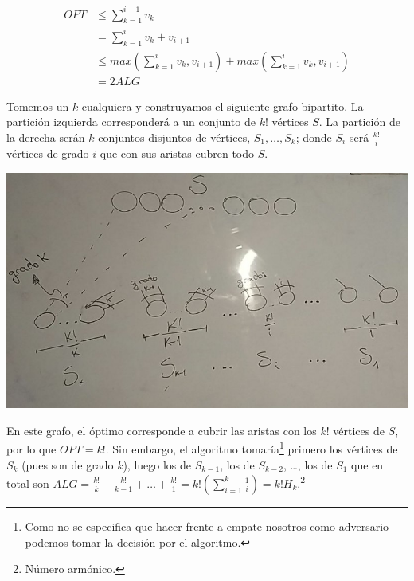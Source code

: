 \documentclass[dcc,uchile]{fcfmcourse}
\begin{document}
\begin{problems}
\begin{enumerate}[a)]
\begin{align*}
    OPT &\le \sum_{k=1}^{i+1} v_{k} \\
    & = \sum_{k=1}^{i} v_{k} + v_{i+1}\\
    &\le max\left(\sum_{k=1}^{i} v_{k}, v_{i+1}\right) + max\left(\sum_{k=1}^{i} v_{k}, v_{i+1}\right)\\
    &= 2ALG
\end{align*}
\end{enumerate}
\newpage
\item Tomemos un $k$ cualquiera y construyamos el siguiente grafo bipartito. La partición izquierda corresponderá a un conjunto de $k!$ vértices $S$. La partición de la derecha serán $k$ conjuntos disjuntos de vértices,  $S_{1},\ldots, S_{k}$; donde $S_{i}$ será $\frac{k!}{i}$ vértices de grado $i$ que con sus aristas cubren todo $S$.\\
\begin{center}
    \includegraphics[scale=0.5]{imagenes/grafo.jpg}
\end{center}
En este grafo, el óptimo corresponde a cubrir las aristas con los $k!$ vértices de $S$, por lo que $OPT = k!$. Sin embargo, el algoritmo tomaría\footnote{Como no se especifica que hacer frente a empate nosotros como adversario podemos tomar la decisión por el algoritmo.} primero los vértices de $S_{k}$ (pues son de grado $k$), luego los de $S_{k-1}$, los de $S_{k-2}$, \ldots , los de $S_{1}$ que en total son $ALG = \frac{k!}{k} + \frac{k!}{k-1} + \ldots + \frac{k!}{1} = k!\left(\sum_{i=1}^k\frac{1}{i}\right) = k!H_{k}$.\footnote{Número armónico.}\\


\end{problems}
\end{document}
